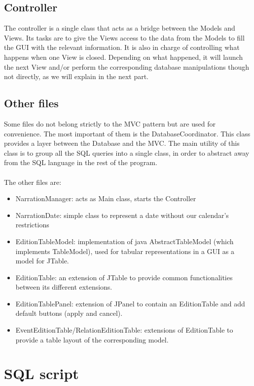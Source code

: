 \documentclass[a4paper ,12pt,french]{article}
\begin{document}
\subsection{Controller}
The controller is a single class that acts as a bridge between the Models and Views. Its tasks are to give the Views access to the data from the Models to fill the GUI with the relevant information. It is also in charge of controlling what happens when one View is closed. Depending on what happened, it will launch the next View and/or perform the corresponding database manipulations though not directly, as we will explain in the next part.

\subsection{Other files}
Some files do not belong strictly to the MVC pattern but are used for convenience. The most important of them is the DatabaseCoordinator. This class provides a layer between the Database and the MVC. The main utility of this class is to group all the SQL queries into a single class, in order to abstract away from the SQL language in the rest of the program. \\ \\
The other files are:
\begin{itemize}
\item NarrationManager: acts as Main class, starts the Controller
\item NarrationDate: simple class to represent a date without our calendar's restrictions
\item EditionTableModel: implementation of java AbstractTableModel (which implements TableModel), used for tabular representations in a GUI as a model for JTable.
\item EditionTable: an extension of JTable to provide common functionalities between its different extensions.
\item EditionTablePanel: extension of JPanel to contain an EditionTable and add default buttons (apply and cancel).
\item EventEditionTable/RelationEditionTable: extensions of EditionTable to provide a table layout of the corresponding model.
\end{itemize}




\section{SQL script}
\end{document}

